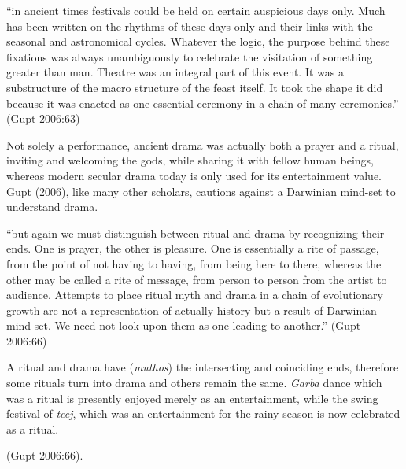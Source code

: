 \begin{myquote}
``in ancient times festivals could be held on certain auspicious days only. Much has been written on the rhythms of these days only and their links with the seasonal and astronomical cycles. Whatever the logic, the purpose behind these fixations was always unambiguously to celebrate the visitation of something greater than man. Theatre was an integral part of this event. It was a substructure of the macro structure of the feast itself. It took the shape it did because it was enacted as one essential ceremony in a chain of many ceremonies.'' 
\hfill (Gupt 2006:63)
\end{myquote}

Not solely a performance, ancient drama was actually both a prayer and a ritual, inviting and welcoming the gods, while sharing it with fellow human beings, whereas modern secular drama today is only used for its entertainment value. Gupt (2006), like many other scholars, cautions against a Darwinian mind-set to understand drama. 

\begin{myquote}
``but again we must distinguish between ritual and drama by recognizing their ends. One is prayer, the other is pleasure. One is essentially a rite of passage, from the point of not having to having, from being here to there, whereas the other may be called a rite of message, from person to person from the artist to audience. Attempts to place ritual myth and drama in a chain of evolutionary growth are not a representation of actually history but a result of Darwinian mind-set. We need not look upon them as one leading to another.''
\hfill(Gupt 2006:66)
\end{myquote}

\begin{myquote}
A ritual and drama have (\textsl{muthos}) the intersecting and coinciding ends, therefore some rituals turn into drama and others remain the same. \textsl{Garba} dance which was a ritual is presently enjoyed merely as an entertainment, while the swing festival of \textsl{teej}, which was an entertainment for the rainy season is now celebrated as a ritual. 

\hfill(Gupt 2006:66).
\end{myquote}

